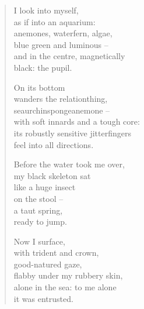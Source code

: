 \begin{verse}

I look into myself,\\
as if into an aquarium:\\
anemones, waterfern, algae,\\
blue green and luminous --\\
and in the centre, magnetically\\
black: the pupil.

On its bottom\\
wanders the relationthing,\\
seaurchinspongeanemone --\\
with soft innards and a tough core:\\
its robustly sensitive jitterfingers\\
feel into all directions.

Before the water took me over,\\
my black skeleton sat\\
like a huge insect\\
on the stool --\\
a taut spring,\\
ready to jump.

Now I surface,\\
with trident and crown,\\
good-natured gaze,\\
flabby under my rubbery skin,\\
alone in the sea: to me alone\\
it was entrusted.

\end{verse}
